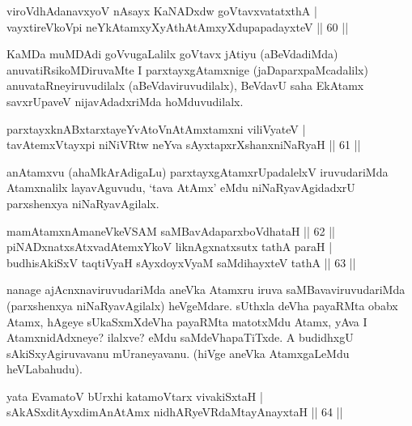 \begin{shl}
viroVdhAdanavxyoV nAsayx KaNADxdw goVtavxvatatxthA |\\
vayxtireVkoV\s pi neYkAtamxyXyAthAtAmxyXdupapadayxteV \hfill || 60 ||
\end{shl}

\begin{artha}
KaMDa muMDAdi goVvugaLalilx goVtavx jAtiyu (aBeVdadiMda) anuvatiRsikoMDiruvaMte I parxtayxgAtamxnige (jaDaparxpaMcadalilx) anuvataRneyiruvudilalx  (aBeVdaviruvudilalx), BeVdavU saha EkAtamx savxrUpaveV nijavAdadxriMda hoMduvudilalx.
\end{artha}


\begin{shl}
parxtayxknABxtarxtayeYvAtoV\s nAtAmx\s \s tamxni viliVyateV |\\
tavA\s \s temxVtayxpi niNiVRtw neYva sAyxtapxrXshanxniNaRyaH \hfill || 61 ||
\end{shl}

\begin{artha}
anAtamxvu (ahaMkArAdigaLu) parxtayxgAtamxrUpadalelxV iruvuda\-\break riMda Atamxnalilx layavAguvudu, `tava AtAmx' eMdu niNaRyavAgidadxrU parxshenxya niNaRyavAgilalx.
\end{artha}

\begin{shl}
mamA\s \s tamxnAmaneVkeVSAM saMBavAdaparxboVdhataH \hfill || 62 ||\\
piNADxnatxsAtxvadAtemxYkoV liknAgxnatxsutx tathA paraH |\\
budhisAkiSxV taqtiVyaH sAyxdoyxV\s yaM saMdihayxteV tathA \hfill || 63 ||
\end{shl}

\begin{artha}
nanage ajAcnxnaviruvudariMda aneVka Atamxru iruva saMBavaviruvudariMda (parxshenxya niNaRyavAgilalx) heVgeMdare. sUthxla deVha  payaRMta obabx Atamx, hAgeye sUkaSxmXdeVha payaRMta matotxMdu Atamx, yAva I AtamxnidAdxneye? ilalxve? eMdu saMdeVhapaTiTxde. A budidhxgU sAkiSxyAgiruvavanu mUraneyavanu. (hiVge aneVka AtamxgaLeMdu heVLabahudu).
\end{artha}

\begin{shl}
yata EvamatoV bUrxhi katamoV\s tarx vivakiSxtaH |\\
sAkASxditAyxdimAnAtAmx nidhARyeVRdaMtayA\s nayxtaH \hfill || 64 ||
\end{shl}

